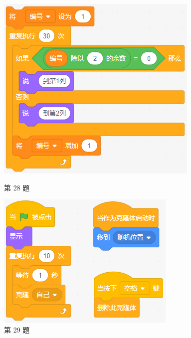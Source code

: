 \documentclass[10pt, a4paper]{article}
\begin{document}
\begin{enumerate}
\begin{figure}[htbp]
\begin{minipage}[t]{.2\textwidth}
                \includegraphics[width=\textwidth]{figure/28.png}
                \caption*{第 28 题}
            \end{minipage}
            \begin{minipage}[t]{.24\textwidth}
                \centering
                \includegraphics[width=\textwidth]{figure/29.png}
                \caption*{第 29 题}
            \end{minipage}
        \end{figure}


\end{enumerate}
\end{document}
